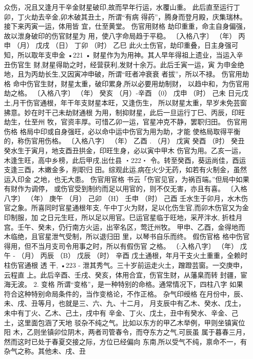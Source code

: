 众伤，况且又逢月干辛金财星破印,故而早年行运，水覆山重。
此后直至运行丁卯，丁火劫去辛金,卯木破其丑土，所谓“有病
得药”，腾身而登月殿，庆集瑞林。接下来丙寅一运，体用皆
宜，仕至黄堂。
伤官用财格
劫印重重，命主自身偏强，故以泄身破印的伤官财星为
用，使八字命局趋于平稳。
〔入格八字〕
（年） 丙申
（月） 戊戌
（日） 丁卯
（时） 乙巳
此火土伤官，劫印重叠，日主身强可知，所以取年支申金
•221 •
财星作为为用神。其人早年得祖上遗业，当运入辛丑伤官生
财,财星得助之时，经营获利,发财十余万。此后壬寅一运，寅
为申金绝地，且为丙劫长生,又因寅冲申破，所谓“旺者冲衰衰
者拔”，所以不禄。
伤官用劫格
命中伤官生财，财星太重，破印累身,所以必要用劫制财，
以趋中和，为伤官用劫之格。
〔入格八字〕
（年） 癸亥
（月）-辛酉
（0） 戊申
（时） 己未
日元戊土,月干伤官通根，年干年支财星本旺，又逢伤生，
所以财星太重，早岁未免芸窗拂意。妙在时干己未劫财通根
为用，制抑财星，此后一旦运行丁巳、丙辰，印旺劫生，仕至州
牧，官资丰厚。可惜乙卯一运，官星冲克不静，罢职归田。
伤官用伤格
格局中印或自身强旺，必以命中运中伤官为用为助，才能
使格局取得平衡的，称伤官用伤格。
〔入格八字〕
（年） 乙酉 .
（月） 戊寅
癸酉
（时） 癸丑
癸水生于寅月，地支酉丑拱金，印旺生身，必以寅中甲木
伤官为用。乙亥一运，木逢生旺，高中乡榜，此后甲戌,出仕县
・222・
令。转至癸酉，葵运尚佳，酉运支逢三酉，木嫩金多，削职归
田。综观此运,病在火少无药，如若有火制金，虽然运入印金
之地，也无大患。
伤官用官格
书云「伤官见官，为祸百端。”但局中如果有财作为调停，
或伤官受到制约而足以用官的，则不仅无害，亦且有喜。
〔入格八字〕
（年） 庚午
（月） 己卯
（H） 壬申
（时） 己酉
壬水生于卯月，水木伤官之象。所喜同时官星通根年支,
午中丁火为财，足以化伤生官,而卯木伤官又为金印制服，加
之日元生旺，所以足以用官。巳运官星临于旺地，采芹泮水,
折桂月宫。壬午、癸未，仍行南方火运，出宰名区，莺迁州牧。
甲申、乙酉，金得地而木临绝，且官星泄气受制，所以退归田
里，以琴书自乐而终。
假伤官格
格中伤官得用，但不当月支司令用事之时，所以有假伤官
之格。
（:入格八字〕
（年） 戊午 - （月） 丙辰
（B） 戊辰
（时） 辛酉
戊土通根，年月干支火土重重，全赖时柱伤官通根 透 干,
•223
-
泄其秀气。三十岁前运走火土，蹭蹬芸窗。一交庚申，云程直
上。此后辛酉、壬戌、癸亥，体用合宜，伤官生财，从藩臬而转
封疆，宦海无波。
2. 变格
所谓“变格”，是一种特别的命格。通常情况下，四柱八字
如果符合这种特别命局条件的，当作变格论，不作正格。
杂气印绶格
在月份中，辰、未、戌、丑等月，也就是三、六、九、十二月，
月支辰中有乙木、癸水、戊土，未中有丁火、乙木、己土，戌中有
辛金、丁火、戊土，丑中有癸水、辛金、己土，这里面包涵了天地
驳杂不纯之气。比如以东方的甲乙木举例，甲则坐镇寅位阳
木，乙则坐镇卯位阴木，两者司管春令，而夺东方之气,可辰虽
属于暮春三月，然而这时已处于春夏交接之际，方位已经偏向
东南,所以受气不纯，禀命不一，有杂气之称。其他未、戌、丑
